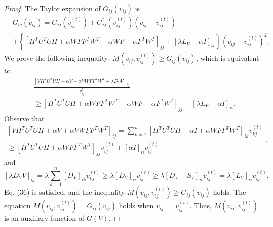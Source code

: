 \documentclass[a4paper,fleqn]{cas-sc}
\begin{document}
\begin{proof}
	The Taylor expansion of $G_{i j}\left(v_{i j}\right)$ is
	\begin{equation}
		\begin{aligned}
		&G_{i j}\left(v_{i j}\right)=G_{i j}\left(v_{i j}^{(t)}\right)+G_{i j}^{\prime}\left(v_{i j}^{(t)}\right)\left(v_{i j}-v_{i j}^{(t)}\right)\\
		& +\left\{\left[H^T U^T U H+\alpha W F F^T W^T- \alpha W F- \alpha F^T W^T\right]_{j j}+[\lambda L_V+\alpha I]_{i i}\right\}\left(v_{i j}-v_{i j}^{(t)}\right)^2. 
		\end{aligned}
	\end{equation}
	We prove the following inequality: $M\left(v_{i j}, v_{i j}^{(t)}\right) \geq G_{i j}\left(v_{i j}\right)$, which is equivalent to
	\begin{equation}
		\begin{aligned}
		&\frac{\left[V H^T U^T U H+\alpha V+\alpha V W F F^T W^T+\lambda D_V V\right]_{i j}}{v_{i j}^t} \\
		& \geq\left[H^T U^T U H+\alpha W F F^T W^T- \alpha W F- \alpha F^T W^T\right]_{j j}+[\lambda L_V+\alpha I]_{i i}. 
		\end{aligned}
	\end{equation}
	Observe that
	\begin{equation}
		\begin{gathered}
			{\left[V H^T U^T U H+\alpha V+\alpha V W F F^T W^T\right]_{i j}=\sum_{k=1}^n\left[H^T U^T U H+\alpha I+\alpha W F F^T W^T\right]_{i k} v_{k j}^{(t)}} \\
			\geq\left[H^T U^T U H+\alpha W F F^T W^T\right]_{j j} v_{i j}^{(t)}+[\alpha I]_{i i} v_{i j}^{(t)}
		\end{gathered},
	\end{equation}
	and
	\begin{equation}
		{\left[\lambda D_V V\right]_{i j}=\lambda \sum_{k=1}^n\left[D_V\right]_{i k} v_{k j}^{(t)} \geq \lambda\left[D_V\right]_{i i} v_{i j}^{(t)} \geq \lambda\left[D_V-S_V\right]_{i i} v_{i j}^{(t)}=\lambda[L_V]_{i i} v_{i j}^{(t)} }.
	\end{equation}
	Eq. (36) is satisfied, and the inequality $M\left(v_{i j}, v_{i j}^{(t)}\right) \geq G_{i j}\left(v_{i j}\right)$ holds. The equation $M\left(v_{i j}, v_{i j}^{(t)}\right)=G_{i j}\left(v_{i j}\right)$ holds when $v_{i j}=$ $v_{i j}^{(t)}$. Thus, $M\left(v_{i j}, v_{i j}^{(t)}\right)$ is an auxiliary function of $G(V)$.
\end{proof}
\end{document}
